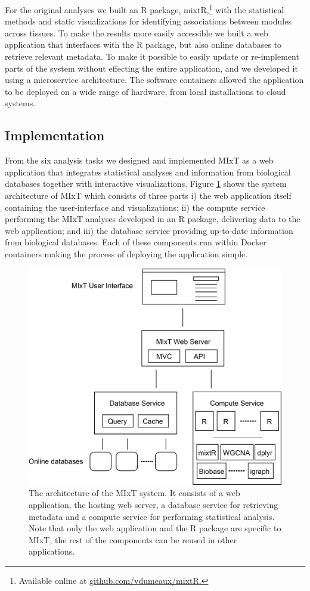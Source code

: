 For the original analyses we built an R package, mixtR,\footnote{Available
online at \url{github.com/vdumeaux/mixtR.}} with the statistical methods and
static visualizations for identifying associations between modules across
tissues. To make the results more easily accessible we built a web application
that interfaces with the R package, but also online databases to retrieve
relevant metadata. To make it possible to easily update or re-implement parts of
the system without effecting the entire application, and we developed it using a
microservice architecture. The software containers allowed the application to be
deployed on a wide range of hardware, from local installations to cloud systems.

\subsection{Implementation} 
From the six analysis tasks we designed and implemented MIxT as a web
application that integrates statistical analyses and information from biological
databases together with interactive visualizations. Figure \ref{kvik-mixt} shows
the system architecture of MIxT which consists of three parts i) the
web application itself containing the user-interface and visualizations; ii) the
compute service performing the MIxT analyses developed in an R package,
delivering data to the web application; and iii) the database service providing
up-to-date information from biological databases.  Each of these components run
within Docker containers making the process of deploying the application simple. 

\begin{figure}[h!]
\centering
\includegraphics[scale=0.4]{figures/mixt-architecture.png}
\caption{The architecture of the MIxT system. It consists of
a web application, the hosting web server, a database service for retrieving
metadata and a compute service for performing statistical analysis. Note that
only the web application and the R package are specific to MIxT, the rest of the
components can be reused in other applications.} 
\label{kvik-mixt}
\end{figure} 

